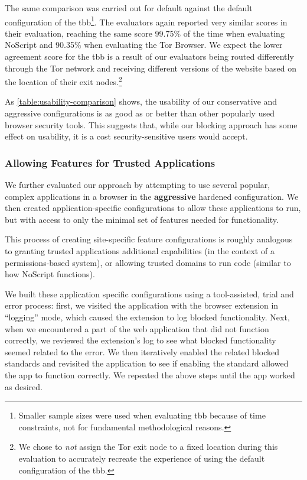 The same comparison was carried out for default \FF against
the default configuration of the \gls{tbb}\footnote{Smaller sample sizes were
used when evaluating \gls{tbb} because of time constraints, not for fundamental
methodological reasons.}.  The evaluators again reported very similar scores in
their evaluation, reaching the same score 99.75\% of the time when evaluating
NoScript and 90.35\% when evaluating the Tor Browser.  We expect the lower
agreement score for the \gls{tbb} is a result of our evaluators being routed
differently through the Tor network and receiving different versions of the
website based on the location of their exit nodes.\footnote{We chose to
\emph{not} assign the Tor exit node to a fixed location during this evaluation
to accurately recreate the experience of using the default configuration of the
\gls{tbb}.}

As \ref{table:usability-comparison} shows, the usability of our conservative
and aggressive configurations is as good as or better than other popularly used
browser security tools.  This suggests that, while our \WASs blocking
approach has some effect on usability, it is a cost security-sensitive users
would accept.


\subsubsection{Allowing Features for Trusted Applications}
We further evaluated our approach by attempting to use several popular,
complex \JS applications in a browser in the \textbf{aggressive} hardened
configuration.  We then created application-specific configurations to allow
these applications to run, but with access to only the minimal set of
features needed for functionality.

This process of creating site-specific feature configurations
is roughly analogous to granting trusted applications additional
capabilities (in the context of a permissions-based system), or allowing trusted
domains to run \JS code (similar to how NoScript functions).

We built these application specific configurations using a tool-assisted, trial
and error process: first, we visited the application with the browser extension
in ``logging'' mode, which caused the extension to log blocked functionality.
Next, when we encountered a part of the web application that did not function
correctly, we reviewed the extension's log to see what blocked functionality
seemed related to the error.  We then iteratively enabled the related blocked
standards and revisited the application to see if enabling the standard
allowed the app to function correctly.  We repeated the above steps until the
app worked as desired.

